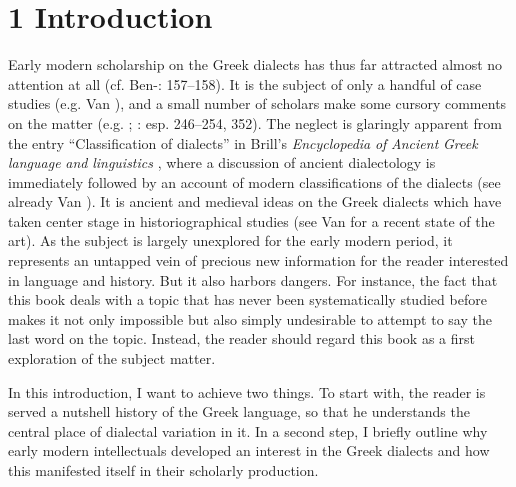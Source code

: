 \section{1  Introduction}
\hypertarget{Toc19704802}{}
Early modern scholarship on the Greek dialects has thus far attracted almost no attention at all (cf. Ben-\citealt{Tov2009}: 157–158). It is the subject of only a handful of case studies (e.g. Van \citealt{Rooy2016c}), and a small number of scholars make some cursory comments on the matter (e.g. \citealt{Botley2010}; \citealt{Roelcke2014}: esp. 246–254, 352). The neglect is glaringly apparent from the entry “Classification of dialects” in Brill’s \textit{Encyclopedia} \textit{of} \textit{Ancient} \textit{Greek} \textit{language} \textit{and} \textit{linguistics} \citep{Finkelberg2014}, where a discussion of ancient dialectology is immediately followed by an account of modern classifications of the dialects (see already Van \citealt{Rooy2016a}). It is ancient and medieval ideas on the Greek dialects which have taken center stage in historiographical studies (see Van \citealt{Rooy2018b} for a recent state of the art). As the subject is largely unexplored for the early modern period, it represents an untapped vein of precious new information for the reader interested in language and history. But it also harbors dangers. For instance, the fact that this book deals with a topic that has never been systematically studied before makes it not only impossible but also simply undesirable to attempt to say the last word on the topic. Instead, the reader should regard this book as a first exploration of the subject matter.

In this introduction, I want to achieve two things. To start with, the reader is served a nutshell history of the Greek language, so that he understands the central place of dialectal variation in it. In a second step, I briefly outline why early modern intellectuals developed an interest in the Greek dialects and how this manifested itself in their scholarly production.

